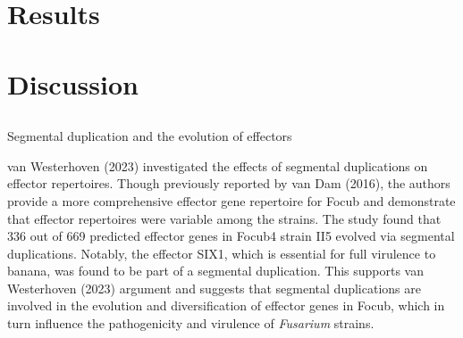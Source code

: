 \newpage
\section{Results}

















\newpage
\section{Discussion}

\subsection{}{Segmental duplication and the evolution of effectors}

van Westerhoven \et (2023) investigated the effects of segmental duplications on effector repertoires.  Though previously reported by van Dam \et (2016), the authors provide a more comprehensive effector gene repertoire for \ac{Focub} and demonstrate that effector repertoires were variable among the strains. The study found that 336 out of 669 predicted effector genes in \ac{Focub4} strain II5 evolved via segmental duplications. Notably, the effector SIX1, which is essential for full virulence to banana, was found to be part of a segmental duplication. This supports van Westerhoven \et (2023) argument and suggests that segmental duplications are involved in the evolution and diversification of effector genes in \ac{Focub}, which in turn influence the pathogenicity and virulence of \textit{Fusarium} strains.

